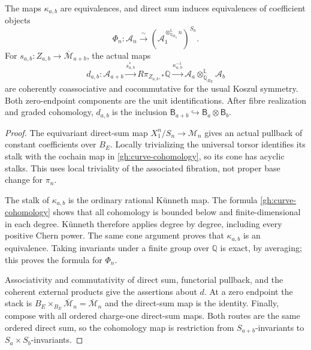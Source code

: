 \begin{proposition}
\label{gh:direct-sum}
The maps $\kappa_{a,b}$ are equivalences, and direct sum induces
equivalences of coefficient objects
\[
 \Phi_n:\mathcal A_n
 \xrightarrow{\ \sim\ }
 \left(\mathcal A_1^{\otimes^{\mathbb L}_{\mathbb Q_{B_E}}n}
                                                    \right)^{S_n}.
\]
For $s_{a,b}:Z_{a,b}\to\overline{\mathcal M}_{a+b}$, the actual maps
\begin{equation}\label{gh:direct-sum-map}
 d_{a,b}:\mathcal A_{a+b}
 \xrightarrow{s_{a,b}^*}
 R\pi_{Z_{a,b},*}\mathbb Q
 \xrightarrow{\kappa_{a,b}^{-1}}
 \mathcal A_a\otimes_{\mathbb Q_{B_E}}^{\mathbb L}\mathcal A_b
\end{equation}
are coherently coassociative and cocommutative for the usual Koszul
symmetry. Both zero-endpoint components are the unit identifications.
After fibre realization and graded cohomology, $d_{a,b}$ is the
inclusion
$\mathsf B_{a+b}\hookrightarrow\mathsf B_a\otimes\mathsf B_b$.
\end{proposition}
\begin{proof}
The equivariant direct-sum map
$X_1^n/S_n\to\mathcal M_n$ gives an actual pullback of constant
coefficients over $B_E$. Locally trivializing the universal torsor
identifies its stalk with the cochain map in
\eqref{gh:curve-cohomology}, so its cone has acyclic stalks.
This uses local triviality of the associated fibration, not proper
base change for $\pi_n$.

The stalk of $\kappa_{a,b}$ is the ordinary rational K\"unneth map.
The formula \eqref{gh:curve-cohomology} shows that all cohomology is
bounded below and finite-dimensional in each degree. K\"unneth
therefore applies degree by degree, including every positive Chern
power. The same cone argument proves that $\kappa_{a,b}$ is an
equivalence. Taking invariants under a finite group over $\mathbb Q$
is exact, by averaging; this proves the formula for $\Phi_n$.

Associativity and commutativity of direct sum, functorial pullback,
and the coherent external products give the assertions about $d$.
At a zero endpoint the stack is
$B_E\times_{B_E}\overline{\mathcal M}_n
=\overline{\mathcal M}_n$ and the direct-sum map is the identity.
Finally, compose with all ordered charge-one direct-sum maps. Both
routes are the same ordered direct sum, so the cohomology map is
restriction from $S_{a+b}$-invariants to
$S_a\times S_b$-invariants.
\end{proof}

